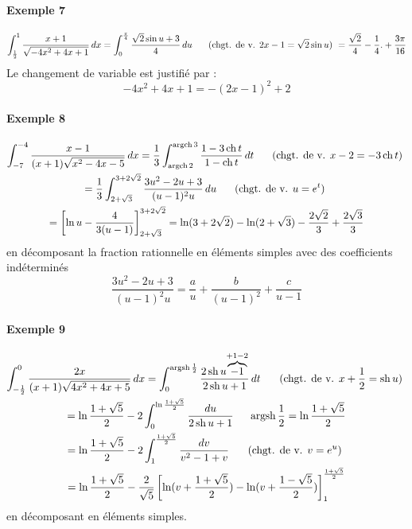 \paragraph{Exemple 7}
\begin{displaymath}
 \int_{\frac{1}{2}}^1\frac{x+1}{\sqrt{-4x^2+4x+1}}\,dx
= \int_0^{\frac{\pi}{4}}\frac{\sqrt{2}\sin u +3}{4}\,du
\hspace{0.5cm}\text{ (chgt. de v. $2x-1 = \sqrt{2}\sin u$) }
= \frac{\sqrt{2}}{4}-\frac{1}{4}. + \frac{3\pi}{16}
\end{displaymath}
Le changement de variable est justifié par :
\begin{displaymath}
 -4x^2+4x+1 = -(2x-1)^2+2
\end{displaymath}

\paragraph{Exemple 8}
\begin{multline*}
 \int_{-7}^{-4}\frac{x-1}{(x+1)\sqrt{x^2-4x-5}}\,dx
=\frac{1}{3}\int_{\mathop{\mathrm{argch}} 2}^{\mathop{\mathrm{argch}} 3}\frac{1-3\mathop{\mathrm{ch}} t}{1- \mathop{\mathrm{ch}} t}\, dt
\hspace{0.5cm}\text{ (chgt. de v. $x-2 = -3\mathop{\mathrm{ch}} t$) } \\
=\frac{1}{3}\int_{2+\sqrt{3}}^{3+2\sqrt{2}}\frac{3u^2-2u+3}{(u-1)^2u}\,du
\hspace{0.5cm}\text{ (chgt. de v. $u = e^t$) } \\
= \left[ \ln u - \frac{4}{3(u-1)}\right]_{2+\sqrt{3}}^{3+2\sqrt{2}} 
= \ln(3+2\sqrt{2})- \ln(2+\sqrt{3}) -\frac{2\sqrt{2}}{3} +\frac{2\sqrt{3}}{3}
\end{multline*}
en décomposant la fraction rationnelle en éléments simples avec des coefficients indéterminés
\begin{displaymath}
 \frac{3u^2-2u+3}{(u-1)^2u} = \frac{a}{u} + \frac{b}{(u-1)^2} + \frac{c}{u-1}
\end{displaymath}

\paragraph{Exemple 9}
\begin{multline*}
 \int_{-\frac{1}{2}}^{0}\frac{2x}{(x+1)\sqrt{4x^2+4x+5}}\,dx
=\int_{0}^{\mathop{\mathrm{argsh}} \frac{1}{2}}\frac{2\mathop{\mathrm{sh}} u \overset{+1-2}{\overbrace{-1}}}{2\mathop{\mathrm{sh}} u +1}\,dt \hspace{0.5cm}\text{ (chgt. de v. $x+\frac{1}{2} = \mathop{\mathrm{sh}} u$) } \\
= \ln\frac{1+\sqrt{5}}{2} - 2 \int_{0}^{\ln\frac{1+\sqrt{5}}{2}}\frac{du}{2\mathop{\mathrm{sh}} u +1} \hspace{0.5cm} \mathop{\mathrm{argsh}} \frac{1}{2} = \ln\frac{1+\sqrt{5}}{2}\\
= \ln\frac{1+\sqrt{5}}{2} -2\int_{1}^{\frac{1+\sqrt{5}}{2}}\frac{dv}{v^2-1+v} \hspace{0.5cm}\text{ (chgt. de v. $v = e^u$) } \\
= \ln\frac{1+\sqrt{5}}{2}-\frac{2}{\sqrt{5}}\left[ \ln(v+\frac{1+\sqrt{5}}{2}) - \ln(v+\frac{1-\sqrt{5}}{2})\right]_1^\frac{1+\sqrt{5}}{2} 
\end{multline*}
en décomposant en éléments simples.

